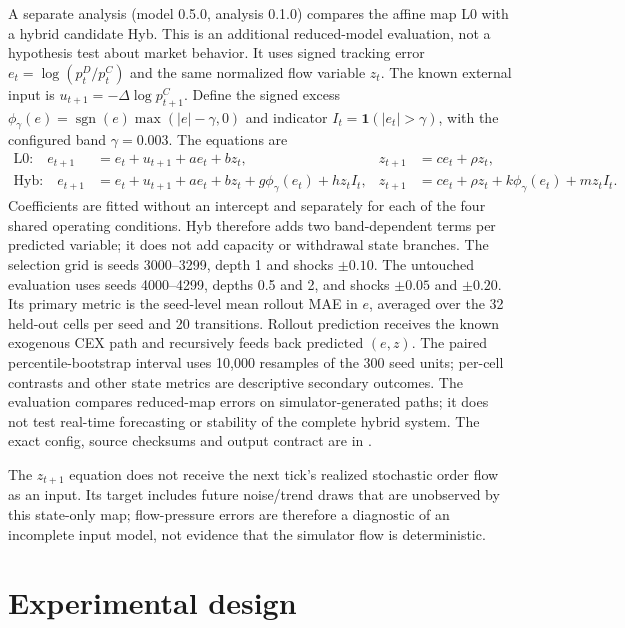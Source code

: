 A separate analysis (model 0.5.0, analysis 0.1.0) compares the affine map L0 with a hybrid candidate Hyb. This is an additional reduced-model evaluation, not a hypothesis test about market behavior. It uses signed tracking error $e_t=\log(p_t^D/p_t^C)$ and the same normalized flow variable $z_t$. The known external input is $u_{t+1}=-\Delta\log p^C_{t+1}$. Define the signed excess $\phi_\gamma(e)=\operatorname{sgn}(e)\max(|e|-\gamma,0)$ and indicator $I_t=\mathbf{1}(|e_t|>\gamma)$, with the configured band $\gamma=0.003$. The equations are
\begin{align}
  \text{L0:}\quad e_{t+1}&=e_t+u_{t+1}+a e_t+b z_t,& z_{t+1}&=c e_t+\rho z_t,\\
  \text{Hyb:}\quad e_{t+1}&=e_t+u_{t+1}+a e_t+b z_t+g\phi_\gamma(e_t)+h z_t I_t,&
  z_{t+1}&=c e_t+\rho z_t+k\phi_\gamma(e_t)+m z_t I_t.
\end{align}
Coefficients are fitted without an intercept and separately for each of the four shared operating conditions. Hyb therefore adds two band-dependent terms per predicted variable; it does not add capacity or withdrawal state branches. The selection grid is seeds 3000--3299, depth 1 and shocks $\pm0.10$. The untouched evaluation uses seeds 4000--4299, depths 0.5 and 2, and shocks $\pm0.05$ and $\pm0.20$. Its primary metric is the seed-level mean rollout MAE in $e$, averaged over the 32 held-out cells per seed and 20 transitions. Rollout prediction receives the known exogenous CEX path and recursively feeds back predicted $(e,z)$. The paired percentile-bootstrap interval uses 10,000 resamples of the 300 seed units; per-cell contrasts and other state metrics are descriptive secondary outcomes. The evaluation compares reduced-map errors on simulator-generated paths; it does not test real-time forecasting or stability of the complete hybrid system. The exact config, source checksums and output contract are in .

The $z_{t+1}$ equation does not receive the next tick's realized stochastic order flow as an input. Its target includes future noise/trend draws that are unobserved by this state-only map; flow-pressure errors are therefore a diagnostic of an incomplete input model, not evidence that the simulator flow is deterministic.

\section{Experimental design}

